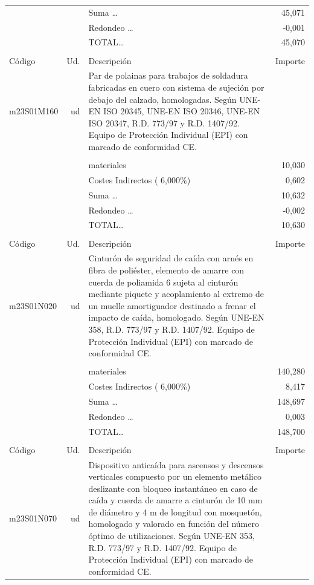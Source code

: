 \documentclass{book}%
\begin{document}
\begin{supertabular}{l r p{60mm} r}
&&Suma \ldots&    45,071\\%
&&Redondeo \ldots&    {-}0,001\\%
%
&&TOTAL\ldots&    45,070\\%
&&&\\%
Código&Ud.&Descripción&Importe\\%
\hline%
m23S01M160&ud&Par de polainas para trabajos de soldadura fabricadas en cuero con sistema de sujeción por debajo del calzado, homologadas. Según UNE{-}EN ISO 20345, UNE{-}EN ISO 20346, UNE{-}EN ISO 20347, R.D. 773/97 y R.D. 1407/92. Equipo de Protección Individual (EPI) con marcado de conformidad CE.&\\%
&&&\\%
&&materiales&    10,030\\%
&&Costes Indirectos (     6,000\%)&     0,602\\%
&&Suma \ldots&    10,632\\%
&&Redondeo \ldots&    {-}0,002\\%
%
&&TOTAL\ldots&    10,630\\%
&&&\\%
Código&Ud.&Descripción&Importe\\%
\hline%
m23S01N020&ud&Cinturón de seguridad de caída con arnés en fibra de poliéster, elemento de amarre con cuerda de poliamida 6 sujeta al cinturón mediante piquete y acoplamiento al extremo de un muelle amortiguador destinado a frenar el impacto de caída, homologado. Según UNE{-}EN 358, R.D. 773/97 y R.D. 1407/92. Equipo de Protección Individual (EPI) con marcado de conformidad CE.&\\%
&&&\\%
&&materiales&   140,280\\%
&&Costes Indirectos (     6,000\%)&     8,417\\%
&&Suma \ldots&   148,697\\%
&&Redondeo \ldots&     0,003\\%
%
&&TOTAL\ldots&   148,700\\%
&&&\\%
Código&Ud.&Descripción&Importe\\%
\hline%
m23S01N070&ud&Dispositivo anticaída para ascensos y descensos verticales compuesto por un elemento metálico deslizante con bloqueo instantáneo en caso de caída y cuerda de amarre a cinturón de 10 mm de diámetro y 4 m de longitud con mosquetón, homologado y valorado en función del número óptimo de utilizaciones. Según UNE{-}EN 353, R.D. 773/97 y R.D. 1407/92. Equipo de Protección Individual (EPI) con marcado de conformidad CE.&\\%

\end{supertabular}
\end{document}
